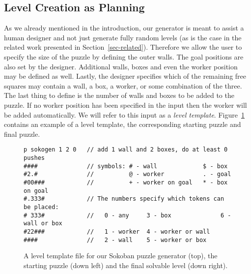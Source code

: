 \documentclass[runningheads]{llncs}
\begin{document}
\subsection{Level Creation as Planning}
As we already mentioned in the introduction, our generator is meant to assist a
human designer and not just generate fully random levels (as is the case in the
related work presented in Section~\ref{sec-related}). Therefore we allow the
user to specify the size of the puzzle by defining the outer walls. The goal
positions are also set by the designer.
Additional walls, boxes and even the
worker position may be defined as well. Lastly, the designer specifies which of the remaining free squares may contain
a wall, a box, a worker, or some combination of the three. The last thing to define
is the number of walls and boxes to be added to the puzzle.
If no worker position has been specified in the input then
the worker will be added automatically. We will refer to this input as a \emph{level template}.
Figure~\ref{fig-input} contains an example of a level template, the
corresponding starting puzzle and final puzzle.

\begin{figure}
\begin{verbatim}
p sokogen 1 2 0   // add 1 wall and 2 boxes, do at least 0 pushes
####              // symbols: # - wall             $ - box
#2.#              //          @ - worker           . - goal
#00###            //          + - worker on goal   * - box on goal
#.333#            // The numbers specify which tokens can be placed:
# 333#            //   0 - any     3 - box              6 - wall or box
#22###            //   1 - worker  4 - worker or wall
####              //   2 - wall    5 - worker or box
\end{verbatim}
\centering
\w\w\w\w\e\e\e\e\w\w\w\w\e\e\n
\w\e\g\w\e\e\e\e\w\w\g\w\e\e\n
\w\e\e\w\w\w\e\e\w\e\p\w\w\w\n
\w\g\e\e\e\w\e\e\w\g\x\x\e\w\n
\w\e\e\e\e\w\e\e\w\e\e\e\e\w\n
\w\e\e\w\w\w\e\e\w\e\e\w\w\w\n
\w\w\w\w\e\e\e\e\w\w\w\w\e\e\n

\caption{A level template file for our Sokoban puzzle generator (top), the starting puzzle (down left)
and the final solvable level (down right).}
\label{fig-input}
\end{figure}
\end{document}
